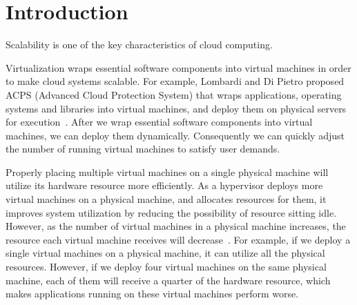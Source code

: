 \chapter{Introduction}


Scalability is one of the key characteristics of cloud computing.


Virtualization wraps essential software components into virtual machines
in order to make cloud systems scalable.
For example, Lombardi and Di Pietro proposed ACPS (Advanced Cloud
Protection System) that wraps applications, operating systems and
libraries into virtual machines, and deploy them on physical servers for
execution~\cite{cite:secure_virt_for_cloud, cite:cloud_issue}.
After we wrap essential software components into virtual machines, we
can deploy them dynamically.
Consequently we can quickly adjust the number of running virtual
machines to satisfy user demands.



Properly placing multiple virtual machines on a single physical machine
will utilize its hardware resource more efficiently.
As a hypervisor deploys more virtual machines on a physical machine, and
allocates resources for them, it improves system utilization by reducing
the possibility of resource sitting idle.
However, as the number of virtual machines in a physical machine
increases, the resource each virtual machine receives will
decrease~\cite{cite:resource_overbooking}.
For example, if we deploy a single virtual machines on a physical
machine, it can utilize all the physical resources.
However, if we deploy four virtual machines on the same physical
machine, each of them will receive a quarter of the hardware resource,
which makes applications running on these virtual machines perform
worse.

